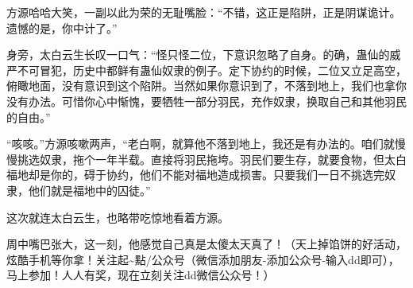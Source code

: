 \begin{this_body}
方源哈哈大笑，一副以此为荣的无耻嘴脸：“不错，这正是陷阱，正是阴谋诡计。遗憾的是，你中计了。”

身旁，太白云生长叹一口气：“怪只怪二位，下意识忽略了自身。的确，蛊仙的威严不可冒犯，历史中都鲜有蛊仙奴隶的例子。定下协约的时候，二位又立足高空，俯瞰地面，没有意识到这个陷阱。当然如果你意识到了，不落到地上，我们也拿你没有办法。可惜你心中惭愧，要牺牲一部分羽民，充作奴隶，换取自己和其他羽民的自由。”

“咳咳。”方源咳嗽两声，“老白啊，就算他不落到地上，我还是有办法的。咱们就慢慢挑选奴隶，拖个一年半载。直接将羽民拖垮。羽民们要生存，就要食物，但太白福地却是你的，碍于协约，他们不能对福地造成损害。只要我们一日不挑选完奴隶，他们就是福地中的囚徒。”

这次就连太白云生，也略带吃惊地看着方源。

周中嘴巴张大，这一刻，他感觉自己真是太傻太天真了！（天上掉馅饼的好活动，炫酷手机等你拿！关注起\~{}點/公众号（微信添加朋友-添加公众号-输入dd即可），马上参加！人人有奖，现在立刻关注dd微信公众号！）

\end{this_body}

